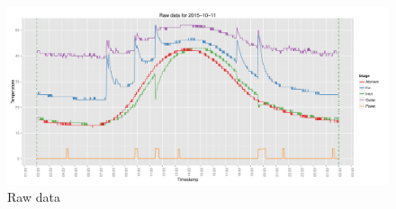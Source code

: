 \documentclass{article}\usepackage[]{graphicx}\usepackage[]{color}
\makeatletter
\def\maxwidth{ %
  \ifdim\Gin@nat@width>\linewidth
    \linewidth
  \else
    \Gin@nat@width
  \fi
}
\newenvironment{knitrout}{}{} %
\makeatother
\begin{document}
\begin{knitrout}
\color{fgcolor}\begin{figure}[h!]
\includegraphics[width=\maxwidth]{figure/raw-1} \caption[Raw data]{Raw data}\label{fig:raw}
\end{figure}


\end{knitrout}
\end{document}
